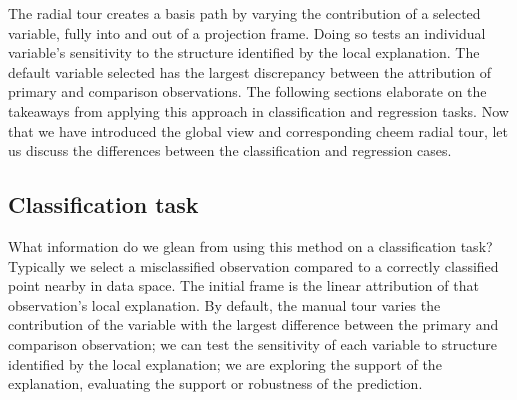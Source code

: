 \documentclass[
]{article}
\begin{document}
The radial tour creates a basis path by varying the contribution of a
selected variable, fully into and out of a projection frame. Doing so
tests an individual variable's sensitivity to the structure identified
by the local explanation. The default variable selected has the largest
discrepancy between the attribution of primary and comparison
observations. The following sections elaborate on the takeaways from
applying this approach in classification and regression tasks. Now that
we have introduced the global view and corresponding cheem radial tour,
let us discuss the differences between the classification and regression
cases.

\hypertarget{classification-task}{%
\subsection{Classification task}\label{classification-task}}

What information do we glean from using this method on a classification
task? Typically we select a misclassified observation compared to a
correctly classified point nearby in data space. The initial frame is
the linear attribution of that observation's local explanation. By
default, the manual tour varies the contribution of the variable with
the largest difference between the primary and comparison observation;
we can test the sensitivity of each variable to structure identified by
the local explanation; we are exploring the support of the explanation,
evaluating the support or robustness of the prediction.
\end{document}
